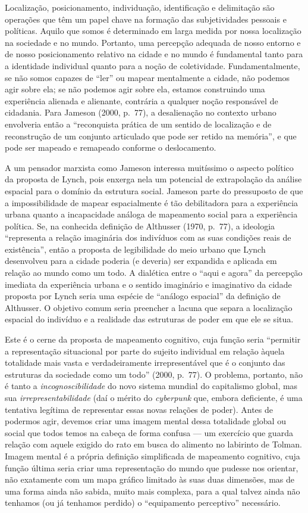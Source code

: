 Localização, posicionamento, individuação, identificação e delimitação
são operações que têm um papel chave na formação das subjetividades
pessoais e políticas. Aquilo que somos é determinado em larga medida por
nossa localização na sociedade e no mundo. Portanto, uma percepção
adequada de nosso entorno e de nosso posicionamento relativo na cidade e
no mundo é fundamental tanto para a identidade individual quanto para a
noção de coletividade. Fundamentalmente, se não somos capazes de ``ler''
ou mapear mentalmente a cidade, não podemos agir sobre ela; se não
podemos agir sobre ela, estamos construindo uma experiência alienada e
alienante, contrária a qualquer noção responsável de cidadania. Para
Jameson (2000, p.~77), a desalienação no contexto urbano envolveria
então a ``reconquista prática de um sentido de localização e de
reconstrução de um conjunto articulado que pode ser retido na memória'',
e que pode ser mapeado e remapeado conforme o deslocamento.

A um pensador marxista como Jameson interessa muitíssimo o aspecto
político da proposta de Lynch, pois enxerga nela um potencial de
extrapolação da análise espacial para o domínio da estrutura social.
Jameson parte do pressuposto de que a impossibilidade de mapear
espacialmente é tão debilitadora para a experiência urbana quanto a
incapacidade análoga de mapeamento social para a experiência política.
Se, na conhecida definição de Althusser (1970, p.~77), a ideologia
``representa a relação imaginária dos indivíduos com as suas condições
reais de existência'', então a proposta de legibilidade do meio urbano
que Lynch desenvolveu para a cidade poderia (e deveria) ser expandida e
aplicada em relação ao mundo como um todo. A dialética entre o ``aqui e
agora'' da percepção imediata da experiência urbana e o sentido
imaginário e imaginativo da cidade proposta por Lynch seria uma espécie
de ``análogo espacial'' da definição de Althusser. O objetivo comum
seria preencher a lacuna que separa a localização espacial do indivíduo
e a realidade das estruturas de poder em que ele se situa.

Este é o cerne da proposta de mapeamento cognitivo, cuja função seria
``permitir a representação situacional por parte do sujeito individual
em relação àquela totalidade mais vasta e verdadeiramente
irrepresentável que é o conjunto das estruturas da sociedade como um
todo'' (2000, p.~77). O problema, portanto, não é tanto a
\emph{incognoscibilidade} do novo sistema mundial do capitalismo global,
mas sua \emph{irrepresentabilidade} (daí o mérito do \emph{cyberpunk}
que, embora deficiente, é uma tentativa legítima de representar essas
novas relações de poder). Antes de podermos agir, devemos criar uma
imagem mental dessa totalidade global ou social que todos temos na
cabeça de forma confusa --- um exercício que guarda relação com aquele
exigido do rato em busca do alimento no labirinto de Tolman. Imagem
mental é a própria definição simplificada de mapeamento cognitivo, cuja
função última seria criar uma representação do mundo que pudesse nos
orientar, não exatamente com um mapa gráfico limitado às suas duas
dimensões, mas de uma forma ainda não sabida, muito mais complexa, para
a qual talvez ainda não tenhamos (ou já tenhamos perdido) o
``equipamento perceptivo'' necessário.

